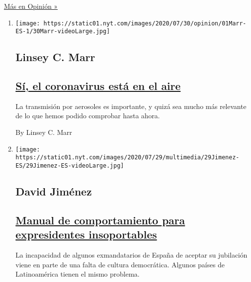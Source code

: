 \href{/es/section/opinion}{Más en Opinión »}

\begin{enumerate}
\def\labelenumi{\arabic{enumi}.}
\item
  \texttt{[image: https://static01.nyt.com/images/2020/07/30/opinion/01Marr-ES-1/30Marr-videoLarge.jpg]}

  \hypertarget{linsey-c-marr}{%
  \subsection{Linsey C. Marr}\label{linsey-c-marr}}

  \hypertarget{suxed-el-coronavirus-estuxe1-en-el-aire}{%
  \subsection{\texorpdfstring{\href{/es/2020/08/01/espanol/opinion/coronavirus-aire.html}{Sí,
  el coronavirus está en el
  aire}}{Sí, el coronavirus está en el aire}}\label{suxed-el-coronavirus-estuxe1-en-el-aire}}

  La transmisión por aerosoles es importante, y quizá sea mucho más
  relevante de lo que hemos podido comprobar hasta ahora.

  By Linsey C. Marr
\item
  \texttt{[image: https://static01.nyt.com/images/2020/07/29/multimedia/29Jimenez-ES/29Jimenez-ES-videoLarge.jpg]}

  \hypertarget{david-jimuxe9nez}{%
  \subsection{David Jiménez}\label{david-jimuxe9nez}}

  \hypertarget{manual-de-comportamiento-para-expresidentes-insoportables}{%
  \subsection{\texorpdfstring{\href{/es/2020/07/29/espanol/opinion/espana-felipe-gonzalez-jose-maria-aznar.html}{Manual
  de comportamiento para expresidentes
  insoportables}}{Manual de comportamiento para expresidentes insoportables}}\label{manual-de-comportamiento-para-expresidentes-insoportables}}

  La incapacidad de algunos exmandatarios de España de aceptar su
  jubilación viene en parte de una falta de cultura democrática. Algunos
  países de Latinoamérica tienen el mismo problema.


\end{enumerate}
